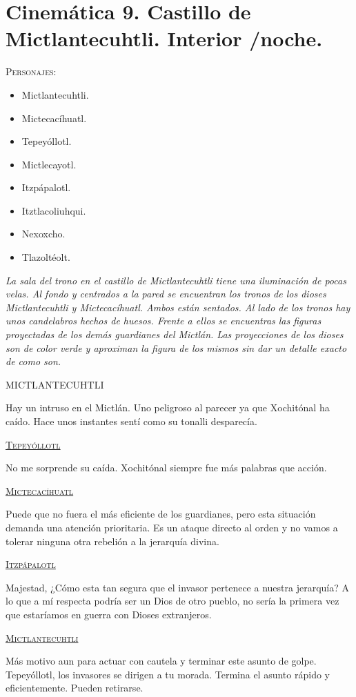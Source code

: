 \section{Cinemática 9. Castillo de Mictlantecuhtli. Interior /noche.}
 \label{Cin:Cinematica09}
  \textsc{Personajes}:
  \begin{itemize}
  \item Mictlantecuhtli.
	\item Mictecacíhuatl.
	\item Tepeyóllotl.
	\item Mictlecayotl.
	\item Itzpápalotl.
	\item Itztlacoliuhqui.
	\item Nexoxcho.
	\item Tlazoltéolt.
  \end{itemize}
  
  \textit{La sala del trono en el castillo de Mictlantecuhtli tiene una iluminación de pocas velas. Al fondo y centrados a la pared se encuentran los tronos de los dioses Mictlantecuhtli y Mictecacíhuatl. Ambos están sentados. Al lado de los tronos hay unos candelabros hechos de huesos. Frente a ellos se encuentras las figuras proyectadas de los demás guardianes del Mictlán. Las proyecciones de los dioses son de color verde y aproximan la figura de los mismos sin dar un detalle exacto de como son.}
  
\begin{center}
	MICTLANTECUHTLI
	\\
\par
Hay un intruso en el Mictlán. Uno peligroso al parecer ya que Xochitónal ha caído. Hace unos instantes sentí como su tonalli desparecía.  
\\
\par
\textsc{\underline{Tepeyóllotl}}
\\
\par
No me sorprende su caída. Xochitónal siempre fue más palabras que acción.
\\
\par
\textsc{\underline{Mictecacíhuatl}}
\\
\par
Puede que no fuera el más eficiente de los guardianes, pero esta situación demanda una atención prioritaria. Es un ataque directo al orden y no vamos a tolerar ninguna otra rebelión a la jerarquía divina.
\\
\par
\textsc{\underline{Itzpápalotl}}
\\
\par
Majestad, ¿Cómo esta tan segura que el invasor pertenece a nuestra jerarquía? A lo que a mí respecta podría ser un Dios de otro pueblo, no sería la primera vez que estaríamos en guerra con Dioses extranjeros.
\\
\par
\textsc{\underline{Mictlantecuhtli}}
\\
\par
Más motivo aun para actuar con cautela y terminar este asunto de golpe. Tepeyóllotl, los invasores se dirigen a tu morada. Termina el asunto rápido y eficientemente. Pueden retirarse.
\end{center}